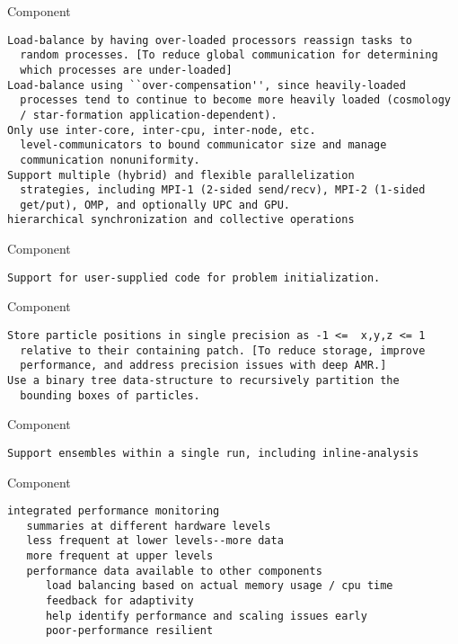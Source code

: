 \documentclass{article}
\begin{document}
 Component

\begin{verbatim}
Load-balance by having over-loaded processors reassign tasks to
  random processes. [To reduce global communication for determining
  which processes are under-loaded]
Load-balance using ``over-compensation'', since heavily-loaded
  processes tend to continue to become more heavily loaded (cosmology
  / star-formation application-dependent).
Only use inter-core, inter-cpu, inter-node, etc.
  level-communicators to bound communicator size and manage
  communication nonuniformity.
Support multiple (hybrid) and flexible parallelization
  strategies, including MPI-1 (2-sided send/recv), MPI-2 (1-sided
  get/put), OMP, and optionally UPC and GPU.
hierarchical synchronization and collective operations
\end{verbatim}

 Component

\begin{verbatim}
Support for user-supplied code for problem initialization.
\end{verbatim}

 Component

\begin{verbatim}
Store particle positions in single precision as -1 <=  x,y,z <= 1
  relative to their containing patch. [To reduce storage, improve
  performance, and address precision issues with deep AMR.]
Use a binary tree data-structure to recursively partition the
  bounding boxes of particles.
\end{verbatim}

 Component

\begin{verbatim}
Support ensembles within a single run, including inline-analysis
\end{verbatim}

 Component

\begin{verbatim}
integrated performance monitoring
   summaries at different hardware levels
   less frequent at lower levels--more data
   more frequent at upper levels
   performance data available to other components
      load balancing based on actual memory usage / cpu time
      feedback for adaptivity
      help identify performance and scaling issues early
      poor-performance resilient
\end{verbatim}
\end{document}
